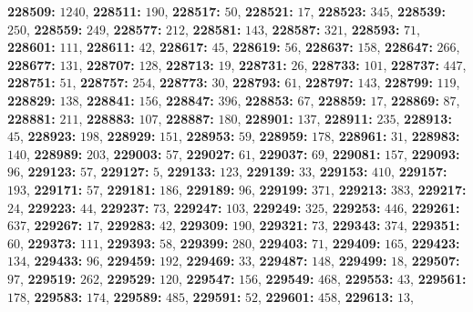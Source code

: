 \textsf{\bfseries 228509:} $1240$, \textsf{\bfseries 228511:} $190$, \textsf{\bfseries 228517:} $50$, \textsf{\bfseries 228521:} $17$, \textsf{\bfseries 228523:} $345$, \textsf{\bfseries 228539:} $250$, \textsf{\bfseries 228559:} $249$, \textsf{\bfseries 228577:} $212$, \textsf{\bfseries 228581:} $143$, \textsf{\bfseries 228587:} $321$, \textsf{\bfseries 228593:} $71$, \textsf{\bfseries 228601:} $111$, \textsf{\bfseries 228611:} $42$, \textsf{\bfseries 228617:} $45$, \textsf{\bfseries 228619:} $56$, \textsf{\bfseries 228637:} $158$, \textsf{\bfseries 228647:} $266$, \textsf{\bfseries 228677:} $131$, \textsf{\bfseries 228707:} $128$, \textsf{\bfseries 228713:} $19$, \textsf{\bfseries 228731:} $26$, \textsf{\bfseries 228733:} $101$, \textsf{\bfseries 228737:} $447$, \textsf{\bfseries 228751:} $51$, \textsf{\bfseries 228757:} $254$, \textsf{\bfseries 228773:} $30$, \textsf{\bfseries 228793:} $61$, \textsf{\bfseries 228797:} $143$, \textsf{\bfseries 228799:} $119$, \textsf{\bfseries 228829:} $138$, \textsf{\bfseries 228841:} $156$, \textsf{\bfseries 228847:} $396$, \textsf{\bfseries 228853:} $67$, \textsf{\bfseries 228859:} $17$, \textsf{\bfseries 228869:} $87$, \textsf{\bfseries 228881:} $211$, \textsf{\bfseries 228883:} $107$, \textsf{\bfseries 228887:} $180$, \textsf{\bfseries 228901:} $137$, \textsf{\bfseries 228911:} $235$, \textsf{\bfseries 228913:} $45$, \textsf{\bfseries 228923:} $198$, \textsf{\bfseries 228929:} $151$, \textsf{\bfseries 228953:} $59$, \textsf{\bfseries 228959:} $178$, \textsf{\bfseries 228961:} $31$, \textsf{\bfseries 228983:} $140$, \textsf{\bfseries 228989:} $203$, \textsf{\bfseries 229003:} $57$, \textsf{\bfseries 229027:} $61$, \textsf{\bfseries 229037:} $69$, \textsf{\bfseries 229081:} $157$, \textsf{\bfseries 229093:} $96$, \textsf{\bfseries 229123:} $57$, \textsf{\bfseries 229127:} $5$, \textsf{\bfseries 229133:} $123$, \textsf{\bfseries 229139:} $33$, \textsf{\bfseries 229153:} $410$, \textsf{\bfseries 229157:} $193$, \textsf{\bfseries 229171:} $57$, \textsf{\bfseries 229181:} $186$, \textsf{\bfseries 229189:} $96$, \textsf{\bfseries 229199:} $371$, \textsf{\bfseries 229213:} $383$, \textsf{\bfseries 229217:} $24$, \textsf{\bfseries 229223:} $44$, \textsf{\bfseries 229237:} $73$, \textsf{\bfseries 229247:} $103$, \textsf{\bfseries 229249:} $325$, \textsf{\bfseries 229253:} $446$, \textsf{\bfseries 229261:} $637$, \textsf{\bfseries 229267:} $17$, \textsf{\bfseries 229283:} $42$, \textsf{\bfseries 229309:} $190$, \textsf{\bfseries 229321:} $73$, \textsf{\bfseries 229343:} $374$, \textsf{\bfseries 229351:} $60$, \textsf{\bfseries 229373:} $111$, \textsf{\bfseries 229393:} $58$, \textsf{\bfseries 229399:} $280$, \textsf{\bfseries 229403:} $71$, \textsf{\bfseries 229409:} $165$, \textsf{\bfseries 229423:} $134$, \textsf{\bfseries 229433:} $96$, \textsf{\bfseries 229459:} $192$, \textsf{\bfseries 229469:} $33$, \textsf{\bfseries 229487:} $148$, \textsf{\bfseries 229499:} $18$, \textsf{\bfseries 229507:} $97$, \textsf{\bfseries 229519:} $262$, \textsf{\bfseries 229529:} $120$, \textsf{\bfseries 229547:} $156$, \textsf{\bfseries 229549:} $468$, \textsf{\bfseries 229553:} $43$, \textsf{\bfseries 229561:} $178$, \textsf{\bfseries 229583:} $174$, \textsf{\bfseries 229589:} $485$, \textsf{\bfseries 229591:} $52$, \textsf{\bfseries 229601:} $458$, \textsf{\bfseries 229613:} $13$, 
